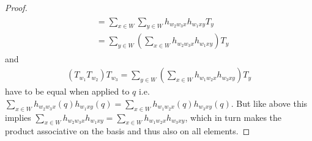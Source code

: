 \documentclass[]{article}
\begin{document}
\begin{proof}
\begin{align}
\begin{split}
            &= \sum_{x \in W}^{}\sum_{y \in W}^{} h_{w_2w_3x} h_{w_1xy}T_y \\
            &= \sum_{y \in W}^{}\left(\sum_{x \in W}^{} h_{w_2w_3x} h_{w_1xy}\right)T_y
        \end{split}
        \label{associativity computation}
    \end{align}
    and 
    \begin{align*}
        (T_{w_1}T_{w_2})T_{w_3} = \sum_{y \in W}^{}\left(\sum_{x \in W}^{} h_{w_1w_2x} h_{w_3xy}\right)T_y
    \end{align*}
    have to be equal when applied to \(q\) i.e.\(\sum_{x \in W}^{}h_{w_2w_3x}(q) h_{w_1xy}(q) = \sum_{x \in W}^{}h_{w_1w_2x}(q) h_{w_3xy}(q)\).
    But like above this implies \(\sum_{x \in W}^{}h_{w_2w_3x} h_{w_1xy} = \sum_{x \in W}^{}h_{w_1w_2x} h_{w_3xy}\), which in turn makes the
    product associative on the basis and thus also on all elements. 
\end{proof}
\end{document}
